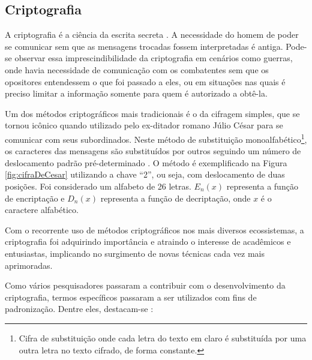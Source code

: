 \documentclass[a4paper,10pt,oneside,conference,final,keeplastbox]{inatel}
\begin{document}
        \subsection{Criptografia}
        \label{subsec:criptografia}
            
            A criptografia é a ciência da escrita secreta \cite{robling1982cryptoAndDataSec}. A necessidade do homem de poder se comunicar sem que as mensagens trocadas fossem interpretadas é antiga. Pode-se observar essa imprescindibilidade da criptografia em cenários como guerras, onde havia necessidade de comunicação com os combatentes sem que os opositores entendessem o que foi passado a eles, ou em situações nas quais é preciso limitar a informação somente para quem é autorizado a obtê-la.
            
            Um dos métodos criptográficos mais tradicionais é o da cifragem simples, que se tornou icônico quando utilizado pelo ex-ditador romano Júlio César para se comunicar com seus subordinados. Neste método de substituição monoalfabético\footnote{Cifra de substituição onde cada letra do texto em claro é substituída por uma outra letra no texto cifrado, de forma constante.}, os caracteres das mensagens são substituídos por outros seguindo um número de deslocamento padrão pré-determinado \cite{cohen2011short}. O método é exemplificado na Figura \ref{fig:cifraDeCesar} utilizando a chave ``2'', ou seja, com deslocamento de duas posições. Foi considerado um alfabeto de 26 letras. $E_n(x)$ representa a função de encriptação e $D_n(x)$ representa a função de decriptação, onde $x$ é o caractere alfabético.
            
            
            
            Com o recorrente uso de métodos criptográficos nos mais diversos ecossistemas, a criptografia foi adquirindo importância e atraindo o interesse de acadêmicos e entusiastas, implicando no surgimento de novas técnicas cada vez mais aprimoradas.
            
            Como vários pesquisadores passaram a contribuir com o desenvolvimento da criptografia, termos específicos passaram a ser utilizados com fins de padronização. Dentre eles, destacam-se \cite{robling1982cryptoAndDataSec}\cite{stallings2006cryptography}:
            
\end{document}
